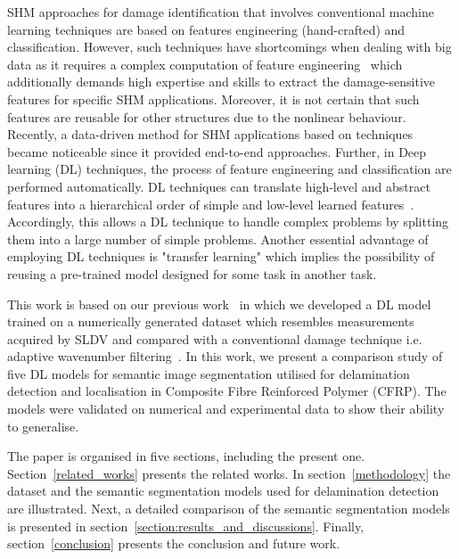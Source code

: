 SHM approaches for damage identification that involves conventional machine learning techniques are based on features engineering (hand-crafted) and classification.
However, such techniques have shortcomings when dealing with big data as it requires a complex computation of feature engineering~\cite{Gulgec2019} which additionally demands high expertise and skills to extract the damage-sensitive features for specific SHM applications.
Moreover, it is not certain that such features are reusable for
other structures due to the nonlinear behaviour.
Recently, a data-driven method for SHM applications based on   techniques became noticeable since it provided end-to-end approaches.
Further, in Deep learning (DL) techniques, the process of feature engineering and classification are performed automatically.
DL techniques can translate high-level and abstract features into a hierarchical order of simple and low-level learned features~\cite{Goodfellow-et-al-2016}.
Accordingly, this allows a DL technique to handle complex problems by splitting them into a large number of simple problems.
Another essential advantage of employing DL techniques is "transfer learning" which implies the possibility of reusing a pre-trained model designed for some task in another task.

This work is based on our previous work~\cite{Ijjeh2021} in which we developed a DL model trained on a numerically generated dataset which resembles measurements acquired by SLDV and compared with a conventional damage technique i.e. adaptive wavenumber filtering~\cite{Kudela2015, Radzienski2019a}.
In this work, we present a comparison study of five DL models for semantic image segmentation utilised for delamination detection and localisation in Composite Fibre Reinforced Polymer (CFRP).
The models were validated on numerical and experimental data to show their ability to generalise.          

The paper is organised in five sections, including the present one.
Section~\ref{related_works} presents the related works.
In section~\ref{methodology} the dataset and the semantic segmentation models used for delamination detection are illustrated. 
Next, a detailed comparison of the semantic segmentation models is presented in section~\ref{section:results_and_discussions}.
Finally, section~\ref{conclusion} presents the conclusion and future work.